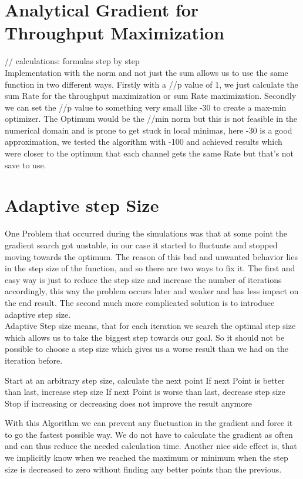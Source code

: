 \section{Analytical Gradient for Throughput Maximization}
// calculations: formulas step by step\\
Implementation with the norm and not just the sum allows us to use the same function in two different ways. Firstly with a //p value of 1, we just calculate the sum Rate for the throughput maximization or sum Rate maximization. Secondly we can set the //p value to something very small like -30 to create a max-min optimizer. The Optimum would be the //min norm but this is not feasible in the numerical domain and is prone to get stuck in local minimas, here -30 is a good approximation, we tested the algorithm with -100 and achieved results which were closer to the optimum that each channel gets the same Rate but that's not save to use.

\section{Adaptive step Size}
One Problem that occurred during the simulations was that at some point the gradient search got unstable, in our case it started to fluctuate and stopped moving towards the optimum. The reason of this bad and unwanted behavior lies in the step size of the function, and so there are two ways to fix it. The first and easy way is just to reduce the step size and increase the number of iterations accordingly, this way the problem occurs later and weaker and has less impact on the end result. The second much more complicated solution is to introduce adaptive step size.\\
Adaptive Step size means, that for each iteration we search the optimal step size which allows us to take the biggest step towards our goal. So it should not be possible to choose a step size which gives us a worse result than we had on the iteration before.
\begin{algorithm}
	Start at an arbitrary step size, calculate the next point
	If next Point is better than last, increase step size
	If next Point is worse than last, decrease step size
	Stop if increasing or decreasing does not improve the result anymore
\end{algorithm}
With this Algorithm we can prevent any fluctuation in the gradient and force it to go the fastest possible way. We do not have to calculate the gradient as often and can thus reduce the needed calculation time. Another nice side effect is, that we implicitly know when we reached the maximum or minimum when the step size is decreased to zero without finding any better points than the previous.

